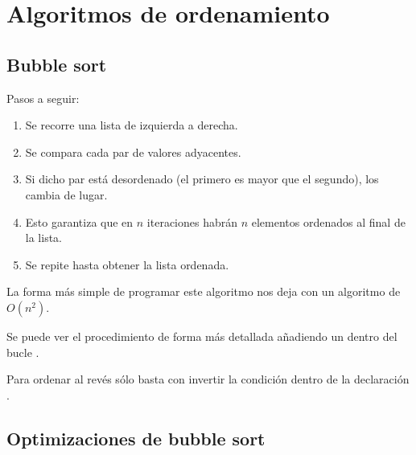 \chapter{Algoritmos de ordenamiento}


\section{Bubble sort}

Pasos a seguir:

\begin{enumerate}
  \item Se recorre una lista de izquierda a derecha.

  \item Se compara cada par de valores adyacentes.
  
  \item Si dicho par está desordenado (el primero es mayor que el segundo), los cambia de lugar.
  
  \item Esto garantiza que en $n$ iteraciones habrán $n$ elementos ordenados al final de la lista.
  
  \item Se repite hasta obtener la lista ordenada.
  
\end{enumerate}

La forma más simple de programar este algoritmo nos deja con un algoritmo de $O(n^2)$.


Se puede ver el procedimiento de forma más detallada añadiendo un  dentro del bucle .


Para ordenar al revés sólo basta con invertir la condición dentro de la declaración .


\section{Optimizaciones de bubble sort}

